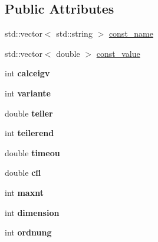 \subsection*{Public Attributes}
\begin{DoxyCompactItemize}
\item 
std\-::vector$<$ std\-::string $>$ \hyperlink{classKonstanten_abd044489471f59656078d51706353bf5}{const\-\_\-name}
\item 
std\-::vector$<$ double $>$ \hyperlink{classKonstanten_a12dc216c8d055e95ed17d819a5949832}{const\-\_\-value}
\item 
\hypertarget{classKonstanten_a79a04aec0180007251b811999e5107b8}{int {\bfseries calceigv}}\label{classKonstanten_a79a04aec0180007251b811999e5107b8}

\item 
\hypertarget{classKonstanten_a2cfd196ff2e81d46929c3efdd00ec62c}{int {\bfseries variante}}\label{classKonstanten_a2cfd196ff2e81d46929c3efdd00ec62c}

\item 
\hypertarget{classKonstanten_a987274e0e5793520b7a445ed9873c3bf}{double {\bfseries teiler}}\label{classKonstanten_a987274e0e5793520b7a445ed9873c3bf}

\item 
\hypertarget{classKonstanten_ae3edf7d78df231706cf8e76244391cab}{int {\bfseries teilerend}}\label{classKonstanten_ae3edf7d78df231706cf8e76244391cab}

\item 
\hypertarget{classKonstanten_a84dfdf3a59e6c5affa98be399569b01a}{double {\bfseries timeou}}\label{classKonstanten_a84dfdf3a59e6c5affa98be399569b01a}

\item 
\hypertarget{classKonstanten_a028517c1cbc7e062a31fb7d204f64a96}{double {\bfseries cfl}}\label{classKonstanten_a028517c1cbc7e062a31fb7d204f64a96}

\item 
\hypertarget{classKonstanten_af02b3d81b23fb756a7821550f17f5817}{int {\bfseries maxnt}}\label{classKonstanten_af02b3d81b23fb756a7821550f17f5817}

\item 
\hypertarget{classKonstanten_ad24e5c861894ff6df3368fbe28ecee56}{int {\bfseries dimension}}\label{classKonstanten_ad24e5c861894ff6df3368fbe28ecee56}

\item 
\hypertarget{classKonstanten_a2d407c35f20f0bf27c2152ed67cb0851}{int {\bfseries ordnung}}\label{classKonstanten_a2d407c35f20f0bf27c2152ed67cb0851}


\end{DoxyCompactItemize}

